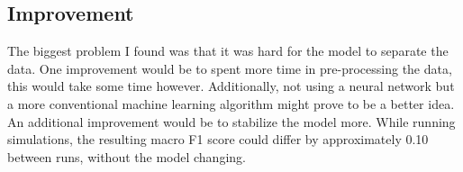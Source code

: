 \documentclass[preprint,12pt]{elsarticle}
\begin{document}
\subsection{Improvement}
The biggest problem I found was that it was hard for the model to separate the data. One improvement would be to spent more time in pre-processing the data, this would take some time however. Additionally, not using a neural network but a more conventional machine learning algorithm might prove to be a better idea. An additional improvement would be to stabilize the model more. While running simulations, the resulting macro F1 score could differ by approximately 0.10 between runs, without the model changing.




\appendix








\end{document}
